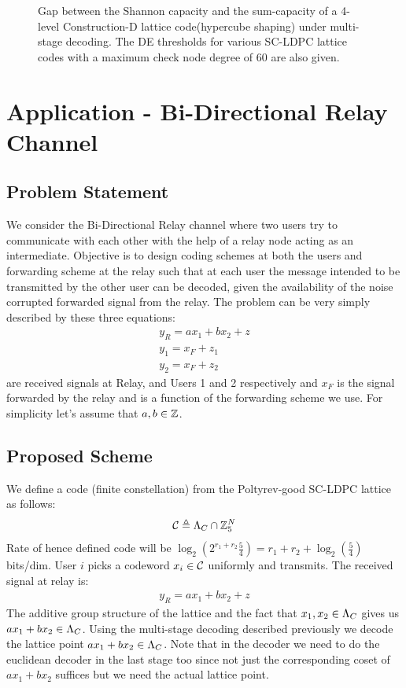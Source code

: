 \begin{figure}
\centering
\setlength{}
\setlength{}

\caption{Gap between the Shannon capacity and the sum-capacity of a 4-level Construction-D lattice code(hypercube shaping) under multi-stage decoding. The DE thresholds for various SC-LDPC lattice codes with a maximum check node degree of $60$ are also given.}	
\label{Fig:ShapingLoss}	
\end{figure}

\section{Application - Bi-Directional Relay Channel}
\subsection{Problem Statement}
We consider the Bi-Directional Relay channel where two users try to communicate with each other with the help of a relay node acting as an intermediate. Objective is to design coding schemes at both the users and forwarding scheme at the relay such that at each user the message intended to be transmitted by the other user can be decoded, given the availability of the noise corrupted forwarded signal from the relay.
The problem can be very simply described by these three equations: 
\begin{align*}
y_{R}=a x_{1}+b x_{2}+z \\
y_{1}=x_{F}+z_{1} \\
y_{2}=x_{F}+z_{2} 
\end{align*}
 are received signals at Relay, and Users 1 and 2 respectively and $x_{F}$ is the signal forwarded by the relay and is a function of the  forwarding scheme we use. For simplicity let's assume that $a,b\in \mathbb{Z}$.

\subsection{Proposed Scheme}
We define a code (finite constellation) from the Poltyrev-good SC-LDPC lattice as follows:
\begin{equation}
\mathcal{C}\triangleq \Lambda_{C}\cap \mathbb{Z}_{5}^{N}
\end{equation}
Rate of hence defined code will be $\log_{2}(2^{r_{1}+r_{2}}\frac{5}{4})=r_{1}+r_{2}+\log_{2}(\frac{5}{4})$ bits/dim. User $i$ picks a codeword $x_{i}\in\mathcal{C}$ uniformly and transmits. The received signal at relay is:
\begin{align*}
y_{R}=a x_{1}+b x_{2} +z
\end{align*}
The additive group structure of the lattice and the fact that $x_{1},x_{2}\in \Lambda_{C}$ gives us $a x_{1}+b x_{2}\in \Lambda_{C}$. Using the multi-stage decoding described previously we decode the lattice point $a x_{1} + b x_{2}\in \Lambda_{C}$. Note that in the decoder we need to do the euclidean decoder in the last stage too since not just the corresponding coset of $a x_{1}+b x_{2}$ suffices but we need the actual lattice point.

